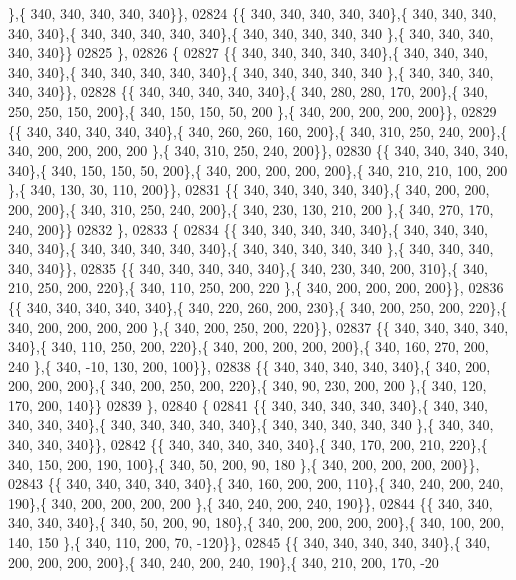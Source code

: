 \begin{DoxyCode}
      \},\{ 340, 340, 340, 340, 340\}\},
02824 \{\{ 340, 340, 340, 340, 340\},\{ 340, 340, 340, 340, 340\},\{ 340, 340, 340, 340, 340\},\{ 340, 340, 340, 340, 340
      \},\{ 340, 340, 340, 340, 340\}\}
02825 \},
02826 \{
02827 \{\{ 340, 340, 340, 340, 340\},\{ 340, 340, 340, 340, 340\},\{ 340, 340, 340, 340, 340\},\{ 340, 340, 340, 340, 340
      \},\{ 340, 340, 340, 340, 340\}\},
02828 \{\{ 340, 340, 340, 340, 340\},\{ 340, 280, 280, 170, 200\},\{ 340, 250, 250, 150, 200\},\{ 340, 150, 150,  50, 200
      \},\{ 340, 200, 200, 200, 200\}\},
02829 \{\{ 340, 340, 340, 340, 340\},\{ 340, 260, 260, 160, 200\},\{ 340, 310, 250, 240, 200\},\{ 340, 200, 200, 200, 200
      \},\{ 340, 310, 250, 240, 200\}\},
02830 \{\{ 340, 340, 340, 340, 340\},\{ 340, 150, 150,  50, 200\},\{ 340, 200, 200, 200, 200\},\{ 340, 210, 210, 100, 200
      \},\{ 340, 130,  30, 110, 200\}\},
02831 \{\{ 340, 340, 340, 340, 340\},\{ 340, 200, 200, 200, 200\},\{ 340, 310, 250, 240, 200\},\{ 340, 230, 130, 210, 200
      \},\{ 340, 270, 170, 240, 200\}\}
02832 \},
02833 \{
02834 \{\{ 340, 340, 340, 340, 340\},\{ 340, 340, 340, 340, 340\},\{ 340, 340, 340, 340, 340\},\{ 340, 340, 340, 340, 340
      \},\{ 340, 340, 340, 340, 340\}\},
02835 \{\{ 340, 340, 340, 340, 340\},\{ 340, 230, 340, 200, 310\},\{ 340, 210, 250, 200, 220\},\{ 340, 110, 250, 200, 220
      \},\{ 340, 200, 200, 200, 200\}\},
02836 \{\{ 340, 340, 340, 340, 340\},\{ 340, 220, 260, 200, 230\},\{ 340, 200, 250, 200, 220\},\{ 340, 200, 200, 200, 200
      \},\{ 340, 200, 250, 200, 220\}\},
02837 \{\{ 340, 340, 340, 340, 340\},\{ 340, 110, 250, 200, 220\},\{ 340, 200, 200, 200, 200\},\{ 340, 160, 270, 200, 240
      \},\{ 340, -10, 130, 200, 100\}\},
02838 \{\{ 340, 340, 340, 340, 340\},\{ 340, 200, 200, 200, 200\},\{ 340, 200, 250, 200, 220\},\{ 340,  90, 230, 200, 200
      \},\{ 340, 120, 170, 200, 140\}\}
02839 \},
02840 \{
02841 \{\{ 340, 340, 340, 340, 340\},\{ 340, 340, 340, 340, 340\},\{ 340, 340, 340, 340, 340\},\{ 340, 340, 340, 340, 340
      \},\{ 340, 340, 340, 340, 340\}\},
02842 \{\{ 340, 340, 340, 340, 340\},\{ 340, 170, 200, 210, 220\},\{ 340, 150, 200, 190, 100\},\{ 340,  50, 200,  90, 180
      \},\{ 340, 200, 200, 200, 200\}\},
02843 \{\{ 340, 340, 340, 340, 340\},\{ 340, 160, 200, 200, 110\},\{ 340, 240, 200, 240, 190\},\{ 340, 200, 200, 200, 200
      \},\{ 340, 240, 200, 240, 190\}\},
02844 \{\{ 340, 340, 340, 340, 340\},\{ 340,  50, 200,  90, 180\},\{ 340, 200, 200, 200, 200\},\{ 340, 100, 200, 140, 150
      \},\{ 340, 110, 200,  70, -120\}\},
02845 \{\{ 340, 340, 340, 340, 340\},\{ 340, 200, 200, 200, 200\},\{ 340, 240, 200, 240, 190\},\{ 340, 210, 200, 170, -20

\end{DoxyCode}
